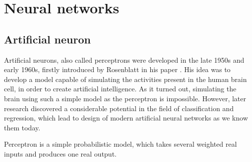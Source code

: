 \chapter{Neural networks}
\label{chapter-ml}

\section{Artificial neuron}

Artificial neurons, also called perceptrons were developed in the late 1950s and early 1960s, firstly introduced by Rosenblatt in his paper \cite{perceptron}. His idea was to develop a model capable of simulating the activities present in the human brain cell, in order to create artificial intelligence. As it turned out, simulating the brain using such a simple model as the perceptron is impossible. However, later research discovered a considerable potential in the field of classification and regression, which lead to design of modern artificial neural networks as we know them today.

Perceptron\cite{nn_book} is a simple probabilistic model, which takes several weighted real inputs and produces one real output.

\vspace{3mm}

